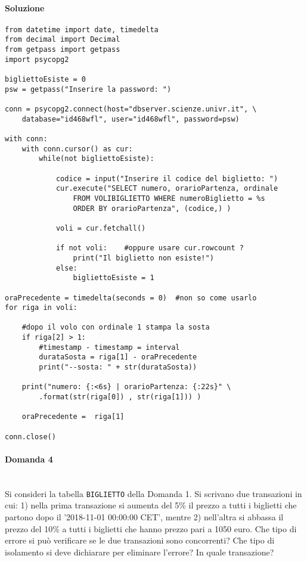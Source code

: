 \documentclass[a4paper, 10pt, titlepage]{article}
\begin{document}
\paragraph{Soluzione}\dotfill
\lstset{language=Python}
\begin{lstlisting}
from datetime import date, timedelta
from decimal import Decimal
from getpass import getpass
import psycopg2

bigliettoEsiste = 0
psw = getpass("Inserire la password: ")
    
conn = psycopg2.connect(host="dbserver.scienze.univr.it", \
	database="id468wfl", user="id468wfl", password=psw)
	
with conn:
	with conn.cursor() as cur:
		while(not bigliettoEsiste):
	
			codice = input("Inserire il codice del biglietto: ")	
			cur.execute("SELECT numero, orarioPartenza, ordinale
				FROM VOLIBIGLIETTO WHERE numeroBiglietto = %s
				ORDER BY orarioPartenza", (codice,) )
				
			voli = cur.fetchall()
			
			if not voli:	#oppure usare cur.rowcount ?
				print("Il biglietto non esiste!")
			else:
				bigliettoEsiste = 1

oraPrecedente = timedelta(seconds = 0)	#non so come usarlo
for riga in voli:

	#dopo il volo con ordinale 1 stampa la sosta
	if riga[2] > 1:
		#timestamp - timestamp = interval
    	durataSosta = riga[1] - oraPrecedente	
        print("--sosta: " + str(durataSosta))
        
	print("numero: {:<6s} | orarioPartenza: {:22s}" \
        .format(str(riga[0]) , str(riga[1])) )
        
    oraPrecedente =  riga[1]
    
conn.close()

\end{lstlisting}
\newpage 
\paragraph{Domanda 4}\dotfill
\\Si consideri la tabella \lstinline|BIGLIETTO| della Domanda 1. Si scrivano due transazioni in cui: 1) nella prima transazione si aumenta del 5\% il prezzo a tutti i biglietti che partono dopo il '2018-11-01 00:00:00 CET', mentre 2) nell'altra si abbassa il prezzo del 10\% a tutti i biglietti che hanno prezzo pari a 1050 euro. Che tipo di errore si può verificare se le due transazioni sono concorrenti? Che tipo di isolamento si deve dichiarare per eliminare l'errore? In quale transazione?
\end{document}
